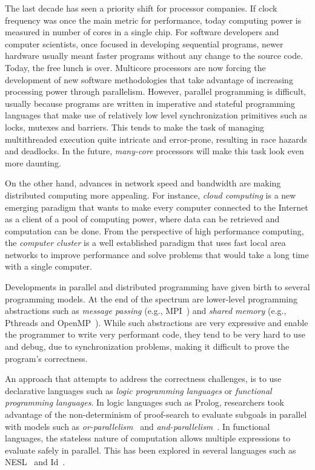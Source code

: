 \documentclass[preprint]{sigplanconf}
\begin{document}
The last decade has seen a priority shift for processor companies. If clock frequency
was once the main metric for performance, today computing power is measured in number of
cores in a single chip.
For software developers and computer scientists, once focused in developing sequential programs,
newer hardware usually meant faster programs without any change to the source code. Today,
the free lunch is over. Multicore processors are now forcing the development of
new software methodologies that take advantage of increasing processing power through parallelism.
However, parallel programming is difficult, usually because programs are written
in imperative and stateful programming languages that make use of relatively low level synchronization
primitives such as locks, mutexes and barriers. This tends to make the task of managing multithreaded
execution quite intricate and error-prone, resulting in race hazards and deadlocks.
In the future, \emph{many-core} processors will make this task look even more daunting.

On the other hand, advances in network speed and bandwidth are making distributed computing
more appealing. For instance, \emph{cloud computing} is a new emerging paradigm that wants
to make every computer connected to the Internet as a client of a pool of computing power,
where data can be retrieved and computation can be done. From the perspective of high performance
computing, the \emph{computer cluster} is a well established paradigm that uses fast local area
networks to improve performance and solve problems that would take a long time with a single computer.

Developments in parallel and distributed programming have given birth to several programming models.
At the end of the spectrum are lower-level programming abstractions such as
\emph{message passing} (e.g., MPI~\cite{gabriel04-open-mpi}) and \emph{shared memory}
(e.g., Pthreads and OpenMP~\cite{Chapman-2007-UOP-1370966}).
While such abstractions are very expressive and enable the programmer to write very performant code,
they tend to be very hard to use and debug, due to synchronization problems, making it difficult to
prove the program's correctness.

An approach that attempts to address the correctness challenges, is to use declarative languages
such as \emph{logic programming languages} or \emph{functional programming languages}. In logic languages such
as Prolog, researchers took advantage of the non-determinism of proof-search to evaluate subgoals
in parallel with models such as \emph{or-parallelism}~\cite{ali-86} and \emph{and-parallelism}~\cite{Shen-92}. In functional languages, the stateless nature of computation
allows multiple expressions to evaluate safely in parallel. This has been explored in several languages
such as NESL~\cite{Blelloch:1996:PPA:227234.227246} and Id~\cite{Nikhil93anoverview}.
\end{document}
